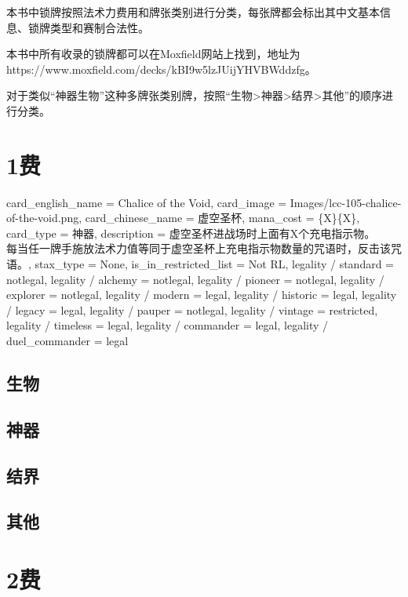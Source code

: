 \documentclass[lang = cn, color = black, 10pt]{AllThatStax}
\begin{document}
本书中锁牌按照法术力费用和牌张类别进行分类，每张牌都会标出其中文基本信息、锁牌类型和赛制合法性。

本书中所有收录的锁牌都可以在Moxfield网站上找到，地址为https://www.moxfield.com/decks/kBI9w5lzJUijYHVBWddzfg。

对于类似“神器生物”这种多牌张类别牌，按照“生物>神器>结界>其他”的顺序进行分类。

\tableofcontents

\mainmatter

\chapter{1费}

\card
{
	card_english_name = Chalice of the Void,
	card_image = Images/lcc-105-chalice-of-the-void.png,
	card_chinese_name = 虚空圣杯,
	mana_cost = \{X\}\{X\},
	card_type = 神器,
	description = 虚空圣杯进战场时上面有X个充电指示物。\\
	每当任一牌手施放法术力值等同于虚空圣杯上充电指示物数量的咒语时，反击该咒语。,
	stax_type = None,
	is_in_restricted_list = Not RL,
	legality / standard = notlegal,
	legality / alchemy = notlegal,
	legality / pioneer = notlegal,
	legality / explorer = notlegal,
	legality / modern = legal,
	legality / historic = legal,
	legality / legacy = legal,
	legality / pauper = notlegal,
	legality / vintage = restricted,
	legality / timeless = legal,
	legality / commander = legal,
	legality / duel_commander = legal
}


\section{生物}

\section{神器}

\section{结界}

\section{其他}

\chapter{2费}
\end{document}
